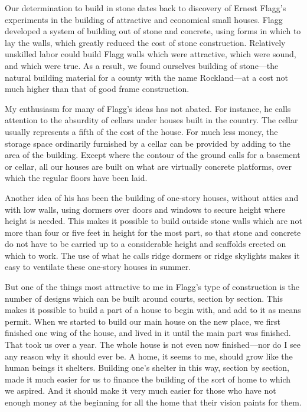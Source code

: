 \documentclass{book}
\begin{document}
Our determination to build in stone dates back to discovery of Ernest Flagg’s experiments in the building of attractive and economical small houses. Flagg developed a system of building out of stone and concrete, using forms in which to lay the walls, which greatly reduced the cost of stone construction. Relatively unskilled labor could build Flagg walls which were attractive, which were sound, and which were true. As a result, we found ourselves building of stone—the natural building material for a county with the name Rockland—at a cost not much higher than that of good frame construction.

My enthusiasm for many of Flagg’s ideas has not abated. For instance, he calls attention to the absurdity of cellars under houses built in the country. The cellar usually represents a fifth of the cost of the house. For much less money, the storage space ordinarily furnished by a cellar can be provided by adding to the area of the building. Except where the contour of the ground calls for a basement or cellar, all our houses are built on what are virtually concrete platforms, over which the regular floors have been laid.

Another idea of his has been the building of one-story houses, without attics and with low walls, using dormers over doors and windows to secure height where height is needed. This makes it possible to build outside stone walls which are not more than four or five feet in height for the most part, so that stone and concrete do not have to be carried up to a considerable height and scaffolds erected on which to work. The use of what he calls ridge dormers or ridge skylights makes it easy to ventilate these one-story houses in summer.

But one of the things most attractive to me in Flagg’s type of construction is the number of designs which can be built around courts, section by section. This makes it possible to build a part of a house to begin with, and add to it as means permit. When we started to build our main house on the new place, we first finished one wing of the house, and lived in it until the main part was finished. That took us over a year. The whole house is not even now finished—nor do I see any reason why it should ever be. A home, it seems to me, should grow like the human beings it shelters. Building one’s shelter in this way, section by section, made it much easier for us to finance the building of the sort of home to which we aspired. And it should make it very much easier for those who have not enough money at the beginning for all the home that their vision paints for them.
\end{document}
